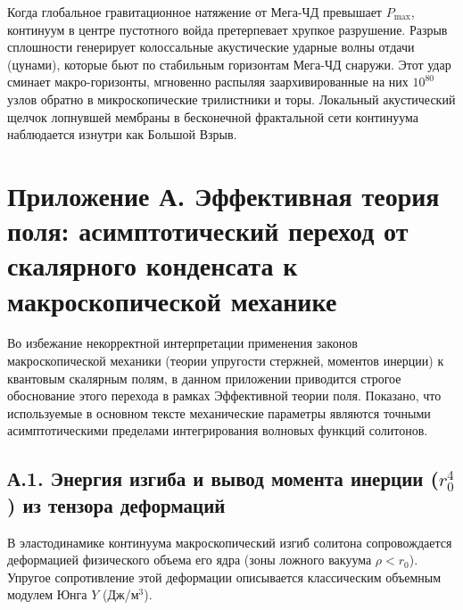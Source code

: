 \documentclass[11pt,a4paper]{article}
\begin{document}
	Когда глобальное гравитационное натяжение от Мега-ЧД превышает $P_{\text{max}}$, континуум в центре пустотного войда претерпевает хрупкое разрушение. Разрыв сплошности генерирует колоссальные акустические ударные волны отдачи (цунами), которые бьют по стабильным горизонтам Мега-ЧД снаружи. Этот удар сминает макро-горизонты, мгновенно распыляя заархивированные на них $10^{80}$ узлов обратно в микроскопические трилистники и торы. Локальный акустический щелчок лопнувшей мембраны в бесконечной фрактальной сети континуума наблюдается изнутри как Большой Взрыв.
	
	\section*{Приложение А. Эффективная теория поля: асимптотический переход от скалярного конденсата к макроскопической механике}
	Во избежание некорректной интерпретации применения законов макроскопической механики (теории упругости стержней, моментов инерции) к квантовым скалярным полям, в данном приложении приводится строгое обоснование этого перехода в рамках Эффективной теории поля. Показано, что используемые в основном тексте механические параметры являются точными асимптотическими пределами интегрирования волновых функций солитонов.
	
	\subsection*{А.1. Энергия изгиба и вывод момента инерции ($r_0^4$) из тензора деформаций}
	В эластодинамике континуума макроскопический изгиб солитона сопровождается деформацией физического объема его ядра (зоны ложного вакуума $\rho < r_0$). Упругое сопротивление этой деформации описывается классическим объемным модулем Юнга $Y$ (Дж/м$^3$).
	
\end{document}
